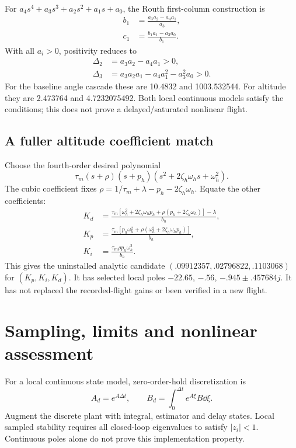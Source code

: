 For $a_4s^4+a_3s^3+a_2s^2+a_1s+a_0$, the Routh first-column construction is
\begin{align}
b_1&=\frac{a_3a_2-a_4a_1}{a_3},\\
c_1&=\frac{b_1a_1-a_3a_0}{b_1}.
\end{align}
With all $a_i>0$, positivity reduces to
\begin{align}
\Delta_2&=a_3a_2-a_4a_1>0,\\
\Delta_3&=a_3a_2a_1-a_4a_1^2-a_3^2a_0>0.
\end{align}
For the baseline angle cascade these are 10.4832 and 1003.532544.
For altitude they are 2.473764 and 4.7232075492. Both local continuous models
satisfy the conditions; this does not prove a delayed/saturated nonlinear flight.

\subsection{A fuller altitude coefficient match}
Choose the fourth-order desired polynomial
\begin{equation}
\tau_m(s+\rho)(s+p_h)(s^2+2\zeta_h\omega_hs+\omega_h^2).
\end{equation}
The cubic coefficient fixes
$\rho=1/\tau_m+\lambda-p_h-2\zeta_h\omega_h$. Equate the other coefficients:
\begin{align}
K_d&=\frac{\tau_m[\omega_h^2+2\zeta_h\omega_hp_h+
\rho(p_h+2\zeta_h\omega_h)]-\lambda}{b_h},\\
K_p&=\frac{\tau_m[p_h\omega_h^2+
\rho(\omega_h^2+2\zeta_h\omega_hp_h)]}{b_h},\\
K_i&=\frac{\tau_m\rho p_h\omega_h^2}{b_h}.
\end{align}
This gives the uninstalled analytic candidate
$(.09912357,.02796822,.1103068)$ for $(K_p,K_i,K_d)$.
It has selected local poles $-22.65$, $-.56$, $-.945\pm.457684j$.
It has not replaced the recorded-flight gains or been verified in a new flight.

\section{Sampling, limits and nonlinear assessment}
For a local continuous state model, zero-order-hold discretization is
\begin{equation}
A_d=e^{A\Delta t},\qquad B_d=\int_0^{\Delta t}e^{A\xi}B\dd\xi.
\end{equation}
Augment the discrete plant with integral, estimator and delay states. Local
sampled stability requires all closed-loop eigenvalues to satisfy $|z_i|<1$.
Continuous poles alone do not prove this implementation property.

